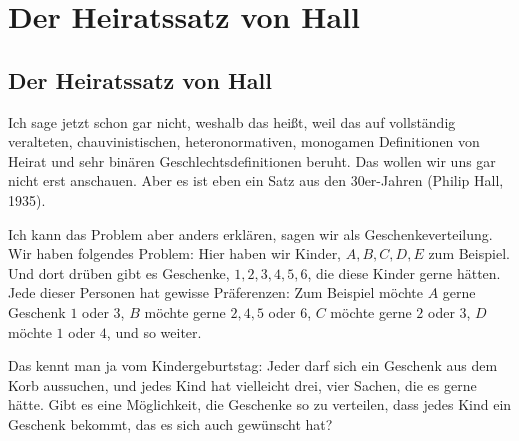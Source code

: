\section{Der Heiratssatz von Hall}

\subsection{Der Heiratssatz von Hall}

\begin{spoken-clean}[01:04:39 - 01:07:08]
Ich sage jetzt schon gar nicht, weshalb das  heißt, weil das auf vollständig veralteten, chauvinistischen, heteronormativen, monogamen Definitionen von Heirat und sehr binären Geschlechtsdefinitionen beruht. Das wollen wir uns gar nicht erst anschauen. Aber es ist eben ein Satz aus den 30er-Jahren (Philip Hall, 1935).

Ich kann das Problem aber anders erklären, sagen wir als Geschenkeverteilung. Wir haben folgendes Problem: Hier haben wir Kinder, $A, B, C, D, E$ zum Beispiel. Und dort drüben gibt es Geschenke, $1, 2, 3, 4, 5, 6$, die diese Kinder gerne hätten. Jede dieser Personen hat gewisse Präferenzen: Zum Beispiel möchte $A$ gerne Geschenk $1$ oder $3$, $B$ möchte gerne $2, 4, 5$ oder $6$, $C$ möchte gerne $2$ oder $3$, $D$ möchte $1$ oder $4$, und so weiter.

Das kennt man ja vom Kindergeburtstag: Jeder darf sich ein Geschenk aus dem Korb aussuchen, und jedes Kind hat vielleicht drei, vier Sachen, die es gerne hätte. Gibt es eine Möglichkeit, die Geschenke so zu verteilen, dass jedes Kind ein Geschenk bekommt, das es sich auch gewünscht hat?
\end{spoken-clean}

